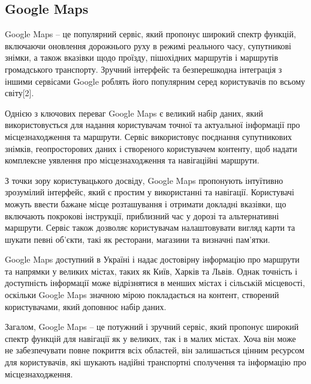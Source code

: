 \subsection{Google Maps}
\label{subsec:google-maps-subsection}

Google Maps -- це популярний сервіс, який пропонує широкий спектр функцій, включаючи оновлення дорожнього руху в режимі реального часу, супутникові знімки, а також вказівки щодо проїзду, пішохідних маршрутів і маршрутів громадського транспорту. Зручний інтерфейс та безперешкодна інтеграція з іншими сервісами Google роблять його популярним серед користувачів по всьому світу[2].

Однією з ключових переваг Google Maps є великий набір даних, який використовується для надання користувачам точної та актуальної інформації про місцезнаходження та маршрути. Сервіс використовує поєднання супутникових знімків, геопросторових даних і створеного користувачем контенту, щоб надати комплексне уявлення про місцезнаходження та навігаційні маршрути.

З точки зору користувацького досвіду, Google Maps пропонують інтуїтивно зрозумілий інтерфейс, який є простим у використанні та навігації. Користувачі можуть ввести бажане місце розташування і отримати докладні вказівки, що включають покрокові інструкції, приблизний час у дорозі та альтернативні маршрути. Сервіс також дозволяє користувачам налаштовувати вигляд карти та шукати певні об'єкти, такі як ресторани, магазини та визначні пам'ятки.

Google Maps доступний в Україні і надає достовірну інформацію про маршрути та напрямки у великих містах, таких як Київ, Харків та Львів. Однак точність і доступність інформації може відрізнятися в менших містах і сільській місцевості, оскільки Google Maps значною мірою покладається на контент, створений користувачами, який доповнює набір даних.

Загалом, Google Maps -- це потужний і зручний сервіс, який пропонує широкий спектр функцій для навігації як у великих, так і в малих містах. Хоча він може не забезпечувати повне покриття всіх областей, він залишається цінним ресурсом для користувачів, які шукають надійні транспортні сполучення та інформацію про місцезнаходження.
